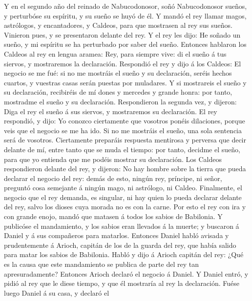  Y en el segundo año del reinado de Nabucodonosor, soñó
Nabucodonosor sueños, y perturbóse su espíritu, y su sueño se huyó de
él.  Y mandó el rey llamar magos, astrólogos, y
encantadores, y Caldeos, para que mostrasen al rey sus sueños. Vinieron
pues, y se presentaron delante del rey.  Y el rey les
dijo: He soñado un sueño, y mi espíritu se ha perturbado por saber del
sueño.  Entonces hablaron los Caldeos al rey en lengua
aramea: Rey, para siempre vive: di el sueño á tus siervos, y mostraremos
la declaración.  Respondió el rey y dijo á los Caldeos: El
negocio se me fué: si no me mostráis el sueño y su declaración, seréis
hechos cuartos, y vuestras casas serán puestas por muladares.
 Y si mostrareis el sueño y su declaración, recibiréis de
mí dones y mercedes y grande honra: por tanto, mostradme el sueño y su
declaración.  Respondieron la segunda vez, y dijeron: Diga
el rey el sueño á sus siervos, y mostraremos su declaración.
 El rey respondió, y dijo: Yo conozco ciertamente que
vosotros ponéis dilaciones, porque veis que el negocio se me ha ido.
 Si no me mostráis el sueño, una sola sentencia será de
vosotros. Ciertamente preparáis respuesta mentirosa y perversa que decir
delante de mí, entre tanto que se muda el tiempo: por tanto, decidme el
sueño, para que yo entienda que me podéis mostrar su declaración.
 Los Caldeos respondieron delante del rey, y dijeron: No
hay hombre sobre la tierra que pueda declarar el negocio del rey: demás
de esto, ningún rey, príncipe, ni señor, preguntó cosa semejante á
ningún mago, ni astrólogo, ni Caldeo.  Finalmente, el
negocio que el rey demanda, es singular, ni hay quien lo pueda declarar
delante del rey, salvo los dioses cuya morada no es con la carne.
 Por esto el rey con ira y con grande enojo, mandó que
matasen á todos los sabios de Babilonia.  Y publicóse el
mandamiento, y los sabios eran llevados á la muerte; y buscaron á Daniel
y á sus compañeros para matarlos.  Entonces Daniel habló
avisada y prudentemente á Arioch, capitán de los de la guarda del rey,
que había salido para matar los sabios de Babilonia. 
Habló y dijo á Arioch capitán del rey: ¿Qué es la causa que este
mandamiento se publica de parte del rey tan apresuradamente? Entonces
Arioch declaró el negocio á Daniel.  Y Daniel entró, y
pidió al rey que le diese tiempo, y que él mostraría al rey la
declaración.  Fuése luego Daniel á su casa, y declaró el
